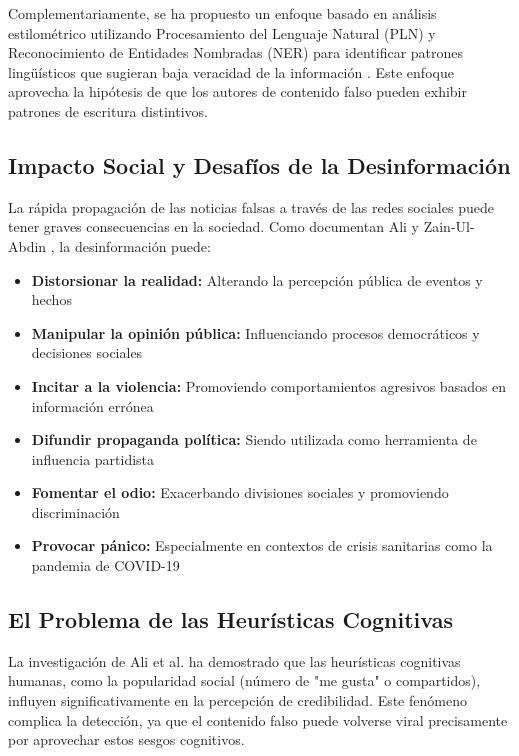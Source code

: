 Complementariamente, se ha propuesto un enfoque basado en análisis estilométrico utilizando Procesamiento del Lenguaje Natural (PLN) y Reconocimiento de Entidades Nombradas (NER) para identificar patrones lingüísticos que sugieran baja veracidad de la información \cite{tsai2023stylometric}. Este enfoque aprovecha la hipótesis de que los autores de contenido falso pueden exhibir patrones de escritura distintivos.

\subsection{Impacto Social y Desafíos de la Desinformación}

La rápida propagación de las noticias falsas a través de las redes sociales puede tener graves consecuencias en la sociedad. Como documentan Ali y Zain-Ul-Abdin \cite{ali2020posttruth}, la desinformación puede:

\begin{itemize}
    \item \textbf{Distorsionar la realidad:} Alterando la percepción pública de eventos y hechos
    \item \textbf{Manipular la opinión pública:} Influenciando procesos democráticos y decisiones sociales
    \item \textbf{Incitar a la violencia:} Promoviendo comportamientos agresivos basados en información errónea
    \item \textbf{Difundir propaganda política:} Siendo utilizada como herramienta de influencia partidista
    \item \textbf{Fomentar el odio:} Exacerbando divisiones sociales y promoviendo discriminación
    \item \textbf{Provocar pánico:} Especialmente en contextos de crisis sanitarias como la pandemia de COVID-19 \cite{perez2020fake}
\end{itemize}

\subsection{El Problema de las Heurísticas Cognitivas}

La investigación de Ali et al. \cite{ali2021fake} ha demostrado que las heurísticas cognitivas humanas, como la popularidad social (número de "me gusta" o compartidos), influyen significativamente en la percepción de credibilidad. Este fenómeno complica la detección, ya que el contenido falso puede volverse viral precisamente por aprovechar estos sesgos cognitivos.

